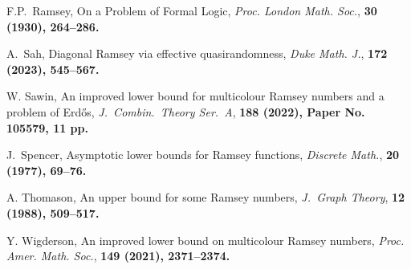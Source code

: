 \documentclass[12pt,reqno]{amsart}
\theoremstyle{definition}
\theoremstyle{remark}
\begin{document}
\begin{thebibliography}{9}
 F.P.~Ramsey, 
On a Problem of Formal Logic, 
\emph{Proc. London Math. Soc.}, \bf 30 \rm (1930), 264--286.

 A.~Sah, 
Diagonal Ramsey via effective quasirandomness, 
\emph{Duke Math. J.}, \bf 172 \rm (2023), 545--567.

 W. Sawin, 
An improved lower bound for multicolour Ramsey numbers and a problem of Erd\H{o}s, 
\emph{J.~Combin.~Theory Ser.~A}, \bf 188 \rm (2022), Paper No. 105579, 11 pp.

 J.~Spencer, 
Asymptotic lower bounds for Ramsey functions, 
\emph{Discrete Math.}, \bf 20 \rm (1977), 69--76. 

 A. Thomason, 
An upper bound for some Ramsey numbers, 
\emph{J.~Graph Theory}, \bf 12 \rm (1988), 509--517.

 Y. Wigderson, 
An improved lower bound on multicolour Ramsey numbers, 
\emph{Proc. Amer. Math. Soc.}, \bf 149 \rm (2021), 2371--2374.

\end{thebibliography}
\end{document}
